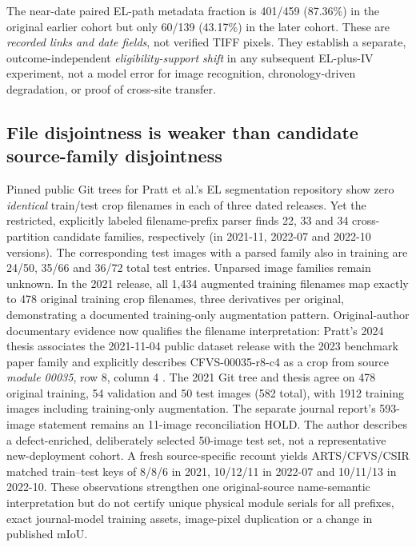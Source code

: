 \documentclass[10pt,a4paper]{article}
\begin{document}
The near-date paired EL-path metadata fraction is 401/459 (87.36\%) in the original earlier cohort but only 60/139 (43.17\%) in the later cohort. These are \emph{recorded links and date fields}, not verified TIFF pixels. They establish a separate, outcome-independent \emph{eligibility-support shift} in any subsequent EL-plus-IV experiment, not a model error for image recognition, chronology-driven degradation, or proof of cross-site transfer.

\subsection{File disjointness is weaker than candidate source-family disjointness}
Pinned public Git trees for Pratt et al.'s EL segmentation repository \cite{pratt2023} show zero \emph{identical} train/test crop filenames in each of three dated releases. Yet the restricted, explicitly labeled filename-prefix parser finds 22, 33 and 34 cross-partition candidate families, respectively (in 2021-11, 2022-07 and 2022-10 versions). The corresponding test images with a parsed family also in training are 24/50, 35/66 and 36/72 total test entries. Unparsed image families remain unknown. In the 2021 release, all 1,434 augmented training filenames map exactly to 478 original training crop filenames, three derivatives per original, demonstrating a documented training-only augmentation pattern. Original-author documentary evidence now qualifies the filename interpretation: Pratt's 2024 thesis associates the 2021-11-04 public dataset release with the 2023 benchmark paper family and explicitly describes CFVS-00035-r8-c4 as a crop from source \emph{module 00035}, row 8, column 4 \cite{prattthesis2024}. The 2021 Git tree and thesis agree on 478 original training, 54 validation and 50 test images (582 total), with 1912 training images including training-only augmentation. The separate journal report's 593-image statement remains an 11-image reconciliation HOLD. The author describes a defect-enriched, deliberately selected 50-image test set, not a representative new-deployment cohort. A fresh source-specific recount yields ARTS/CFVS/CSIR matched train--test keys of 8/8/6 in 2021, 10/12/11 in 2022-07 and 10/11/13 in 2022-10. These observations strengthen one original-source name-semantic interpretation but do not certify unique physical module serials for all prefixes, exact journal-model training assets, image-pixel duplication or a change in published mIoU.
\end{document}

